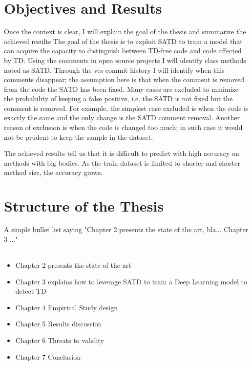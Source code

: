 \newpage




\section{Objectives and Results}
Once the context is clear, I will explain the goal of the thesis and summarize the achieved results
The goal of the thesis is to exploit SATD to train a model that can acquire the capacity to distinguish between TD-free code and code affected by TD.
Using the comments in open source projects I will identify class methods noted as SATD. Through the vcs commit history I will identify when this comments disappear; the assumption here is that when the comment is removed from the code the SATD has been fixed. Many cases are excluded to minimize the probability of keeping a false positive, i.e. the SATD is not fixed but the comment is removed. For example, the simplest case excluded is when the code is exactly the same and the only change is the SATD comment removal. Another reason of exclusion is when the code is changed too much; in such case it would not be prudent to keep the sample in the dataset.

The achieved results tell us that it is difficult to predict with high accuracy on methods with big bodies. As the train dataset is limited to shorter and shorter method size, the accuracy grows. 


\section{Structure of the Thesis}
A simple bullet list saying "Chapter 2 presents the state of the art, bla... Chapter 3 ..."
\\
\\

\begin{itemize}
  \item Chapter 2 presents the state of the art
  \item Chapter 3 explains how to leverage SATD to train a Deep Learning model to detect TD
  \item Chapter 4 Empirical Study design
  \item Chapter 5 Results discussion
  \item Chapter 6 Threats to validity
  \item Chapter 7 Conclusion
\end{itemize}
